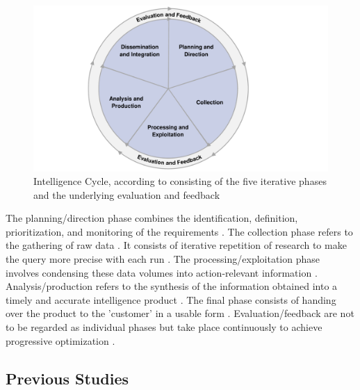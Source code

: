 \documentclass[10pt]{article}
\begin{document}
\begin{figure}[h]
    \centering
    \includegraphics[clip,width=0.6\linewidth]{PDF/images/crop_Intelligence Cycle}
    \caption{Intelligence Cycle, according to \cite{JointChiefsofStaffU.S.Army.2013} consisting of the five iterative phases and the underlying evaluation and feedback}
    \label{fig: Intelligence Cycle}
\end{figure}

The planning/direction phase combines the identification, definition, prioritization, and monitoring
of the requirements \cite{JointChiefsofStaffU.S.Army.2013}.
The collection phase refers to the gathering of raw data \cite{CentralIntelligenceAgency.1987}.
It consists of iterative repetition of research
\cite{NorthAtlanticTreatyOrganization.2001} to make the query more precise with each run
\cite{PastorGalindo.2020}. The processing/exploitation phase involves condensing
these data volumes into action-relevant information
\cite{JointChiefsofStaffU.S.Army.2013}.
Analysis/production refers to the synthesis of the information obtained into a timely and accurate intelligence product
\cite{Hwang.2022, NorthAtlanticTreatyOrganization.2001}.
The final phase consists of handing over the product to the 'customer' in a
usable form \cite{CentralIntelligenceAgency.2023, Williams.2018}.
Evaluation/feedback are not to be regarded as individual phases
but take place continuously to achieve progressive optimization
\cite{JointChiefsofStaffU.S.Army.2013, NorthAtlanticTreatyOrganization.2001}.

\subsection{Previous Studies}
\end{document}
